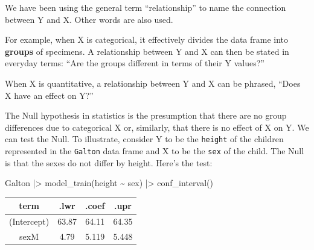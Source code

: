 \documentclass[
  letterpaper,
  DIV=11,
  numbers=noendperiod,
  oneside]{scrartcl}
\newenvironment{Shaded}{\begin{snugshade}}{\end{snugshade}}
\newcommand{\FunctionTok}[1]{\textcolor[rgb]{0.28,0.35,0.67}{#1}}
\newcommand{\NormalTok}[1]{\textcolor[rgb]{0.00,0.23,0.31}{#1}}
\newcommand{\SpecialCharTok}[1]{\textcolor[rgb]{0.37,0.37,0.37}{#1}}
\begin{document}
\begin{tcolorbox}[enhanced jigsaw, colbacktitle=quarto-callout-note-color!10!white, opacityback=0, breakable, opacitybacktitle=0.6, colback=white, coltitle=black, arc=.35mm, title=\textcolor{quarto-callout-note-color}{\faInfo}\hspace{0.5em}{Relationships, differences, and effects}, left=2mm, colframe=quarto-callout-note-color-frame, rightrule=.15mm, bottomrule=.15mm, leftrule=.75mm, bottomtitle=1mm, toptitle=1mm, titlerule=0mm, toprule=.15mm]

We have been using the general term ``relationship'' to name the
connection between Y and X. Other words are also used.

For example, when X is categorical, it effectively divides the data
frame into \textbf{groups} of specimens. A relationship between Y and X
can then be stated in everyday terms: ``Are the groups different in
terms of their Y values?''

When X is quantitative, a relationship between Y and X can be phrased,
``Does X have an effect on Y?''

\end{tcolorbox}

The Null hypothesis in statistics is the presumption that there are no
group differences due to categorical X or, similarly, that there is no
effect of X on Y. We can test the Null. To illustrate, consider Y to be
the \texttt{height} of the children represented in the \texttt{Galton}
data frame and X to be the \texttt{sex} of the child. The Null is that
the sexes do not differ by height. Here's the test:

\begin{Shaded}
\begin{Highlighting}[]
\NormalTok{Galton }\SpecialCharTok{|\textgreater{}} 
  \FunctionTok{model\_train}\NormalTok{(height }\SpecialCharTok{\textasciitilde{}}\NormalTok{ sex) }\SpecialCharTok{|\textgreater{}}
  \FunctionTok{conf\_interval}\NormalTok{()}
\end{Highlighting}
\end{Shaded}

\begin{longtable}[]{@{}cccc@{}}
\toprule\noalign{}
term & .lwr & .coef & .upr \\
\midrule\noalign{}
\endhead
\bottomrule\noalign{}
\endlastfoot
(Intercept) & 63.87 & 64.11 & 64.35 \\
sexM & 4.79 & 5.119 & 5.448 \\
\end{longtable}
\end{document}
